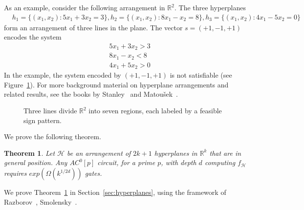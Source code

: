 \documentclass[11pt]{article}
\newtheorem{theorem}{Theorem}[section]
\theoremstyle{definition}
\newcommand{\1}{\mathbf{1}}
\newcommand{\R}{{\mathbb R}}
\renewcommand{\H}{\mathcal{H}}
\begin{document}
As an example, consider the following arrangement in $\R^2$.  The three hyperplanes
\begin{align*}
&h_1 = \{(x_1,x_2):5x_1+3x_2=3\}, h_2=\{(x_1,x_2):8x_1-x_2=8\},
h_3=\{(x_1,x_2):4x_1-5x_2=0\}
\end{align*}
form an arrangement of three lines in the plane. 
The vector $s=(+1,-1,+1)$ encodes the system
\begin{align*}
&5x_1+3x_2>3 \tag{$s(1)=+1$}\\
&8x_1-x_2<8\tag{$s(2)=-1$}\\
&4x_1+5x_2>0\tag{$s(3)=+1$}
\end{align*}
\noindent
In the  example, the system encoded by $(+1,-1,+1)$ is not satisfiable (see Figure~\ref{fig:arrangement}).  
For more background material on hyperplane arrangements and related results, see the books by Stanley~\cite{stanley} and Matou\v{s}ek~\cite{matousek}.

\begin{figure}[t]
\begin{center} 
\end{center}
\caption{Three lines divide $\mathbb{R}^2$ into seven regions, each labeled by a feasible sign pattern.} \label{fig:arrangement}
\end{figure}

We prove the following theorem.
\begin{theorem}\label{thm:hyperplanes}
Let $\mathcal{H}$ be an arrangement of $2k+1$ hyperplanes in $\R^k$ that are in general position.  Any $AC^0[p]$ circuit, for a prime $p$, with depth $d$ computing $f_\H$ requires $exp(\Omega(k^{1/2d}))$ gates. 
\end{theorem}
\noindent
We prove Theorem~\ref{thm:hyperplanes} in Section~\ref{sec:hyperplanes}, using
the framework of Razborov~\cite{razborov}, Smolensky~\cite{smolensky87}. \vspace{.03in}
\end{document}
